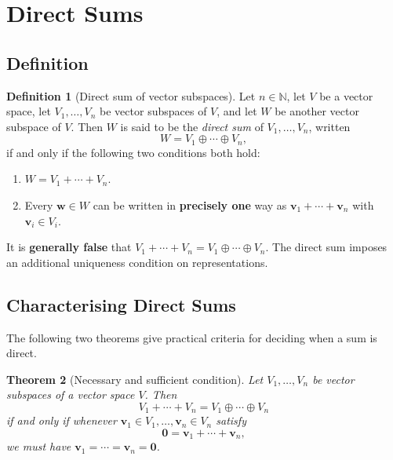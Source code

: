 \documentclass[11pt, a4paper, notitlepage]{report}
\newtheorem{theorem}{Theorem}[section]
\theoremstyle{definition}
\newtheorem{definition}[theorem]{Definition}
\theoremstyle{remark}
\begin{document}
\section{Direct Sums}
\label{sec:direct-sums}

\subsection{Definition}

\begin{definition}[Direct sum of vector subspaces]\label{def:direct-sum}
Let $n \in \mathbb{N}$, let $V$ be a vector space, let $V_1, \ldots, V_n$ be vector subspaces of $V$, and let $W$ be another vector subspace of $V$. Then $W$ is said to be the \emph{direct sum} of $V_1, \ldots, V_n$, written
\[
  W = V_1 \oplus \cdots \oplus V_n,
\]
if and only if the following two conditions both hold:
\begin{enumerate}
  \item $W = V_1 + \cdots + V_n$.
  \item Every $\mathbf{w} \in W$ can be written in \textbf{precisely one} way as $\mathbf{v}_1 + \cdots + \mathbf{v}_n$ with $\mathbf{v}_i \in V_i$.
\end{enumerate}
\end{definition}

\begin{warning}[title={Warning: Sum $\neq$ Direct Sum in General}]
It is \textbf{generally false} that $V_1 + \cdots + V_n = V_1 \oplus \cdots \oplus V_n$. The direct sum imposes an additional uniqueness condition on representations.
\end{warning}

\subsection{Characterising Direct Sums}

The following two theorems give practical criteria for deciding when a sum is direct.

\begin{theorem}[Necessary and sufficient condition]\label{thm:direct-sum-nsc}
Let $V_1, \ldots, V_n$ be vector subspaces of a vector space $V$. Then
\[
  V_1 + \cdots + V_n = V_1 \oplus \cdots \oplus V_n
\]
if and only if whenever $\mathbf{v}_1 \in V_1, \ldots, \mathbf{v}_n \in V_n$ satisfy
\[
  \mathbf{0} = \mathbf{v}_1 + \cdots + \mathbf{v}_n,
\]
we must have $\mathbf{v}_1 = \cdots = \mathbf{v}_n = \mathbf{0}$.
\end{theorem}
\end{document}
